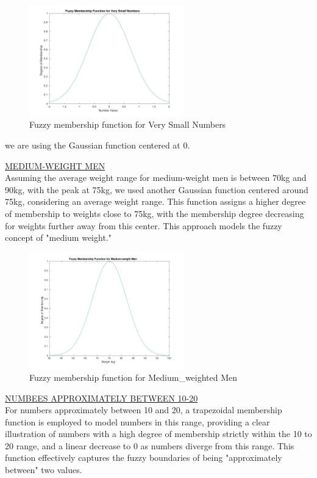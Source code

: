\begin{figure}[H]
	\centering
	\includegraphics[width=0.6\textwidth]{../Problem 7/small_int.pdf}
	\caption{Fuzzy membership function for Very Small Numbers}	
\end{figure}
we are using the Gaussian function centered at 0.
\vspace{5mm}

\underline{MEDIUM-WEIGHT MEN}\\
Assuming the average weight range for medium-weight men is between 70kg and 90kg, with the peak at 75kg, we used another Gaussian function centered around 75kg, considering an average weight range. This function assigns a higher degree of membership to weights close to 75kg, with the membership degree decreasing for weights further away from this center. This approach models the fuzzy concept of "medium weight."

\begin{figure}[H]
	\centering
	\includegraphics[width=0.6\textwidth]{../Problem 7/medium_weight.pdf}
	\caption{Fuzzy membership function for Medium\_weighted Men}	
\end{figure}
\vspace{5mm}

\underline{NUMBEES APPROXIMATELY BETWEEN 10-20}\\
For numbers approximately between 10 and 20, a trapezoidal membership function is employed to model numbers in this range, providing a clear illustration of numbers with a high degree of membership strictly within the 10 to 20 range, and a linear decrease to 0 as numbers diverge from this range. This function effectively captures the fuzzy boundaries of being "approximately between" two values.

